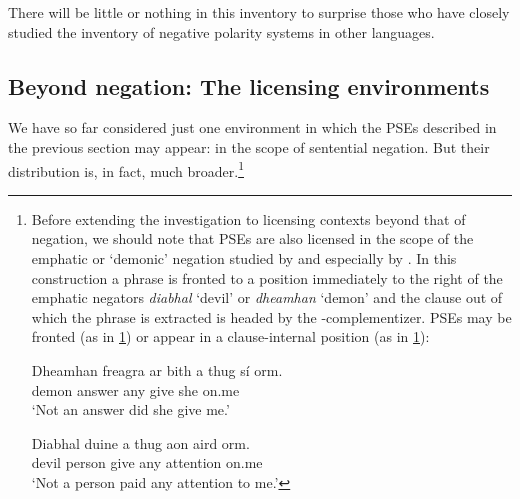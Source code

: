 \documentclass[output=paper,colorlinks,citecolor=brown]{langscibook}
\begin{document}
There will be little or nothing in this inventory to surprise those who have closely studied the inventory of negative polarity systems in other languages.

\subsection{Beyond negation: The licensing environments}
\label{sec:beyond}
We have so far considered just one environment in which the PSEs described in the previous section may appear: in the scope of sentential negation. But their distribution is, in fact, much broader.\footnote{Before extending the investigation to licensing contexts beyond that of negation, we should note that PSEs are also licensed in the scope of the emphatic or `demonic' negation studied by \citet[326--331]{o-siadhail-book} and especially by \citet{dantuono:23}. In this construction a phrase is   fronted to a position immediately to the right of the emphatic negators {\itshape diabhal} `devil' or {\itshape dheamhan} `demon' and the clause out of which the phrase is extracted is headed by the \WH-complementizer. PSEs may be fronted (as in \ref{ex:fronted}) or appear in a clause-internal position (as in \ref{ex:internal}):

\ea
\label{ex:fronted}
\gll Dheamhan freagra {ar bith} a thug sí orm. \\
     demon answer any {\aL} {give\past} she on.me \\
\glt `Not an answer did she give me.'
\z

\ea
\label{ex:internal}
\gll Diabhal duine a thug aon aird orm. \\       
     devil person {\aL} {give\past} any attention on.me\\
\glt `Not a person paid any attention to me.'
\z
}


\end{document}
